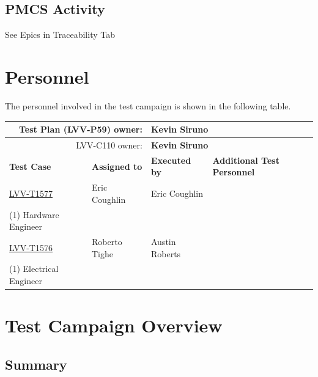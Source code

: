 \documentclass[SE,lsstdraft,STR,toc]{lsstdoc}
\begin{document}
  \subsection{PMCS Activity}
  See Epics in Traceability Tab


\newpage
\section{Personnel}
\label{sect:personnel}

The personnel involved in the test campaign is shown in the following table.

\begin{longtable}{p{3cm}p{3cm}p{3cm}p{6cm}}
\hline
\multicolumn{2}{r}{Test Plan (LVV-P59) owner:} &
\multicolumn{2}{l}{\textbf{ Kevin Siruno } }\\\hline
\multicolumn{2}{r}{ LVV-C110 owner:} &
\multicolumn{2}{l}{\textbf{
    Kevin Siruno
}
} \\\hline
\textbf{Test Case} & \textbf{Assigned to} & \textbf{Executed by} & \textbf{Additional Test Personnel} \\ \hline
\href{https://jira.lsstcorp.org/secure/Tests.jspa#/testCase/LVV-T1577}{LVV-T1577}
& {\small Eric Coughlin } & {\small Eric Coughlin } &
\begin{minipage}[]{6cm}
\smallskip
{\small (1) Software Engineer\\
(1) Hardware Engineer
 }
\medskip
\end{minipage}
\\ \hline
\href{https://jira.lsstcorp.org/secure/Tests.jspa#/testCase/LVV-T1576}{LVV-T1576}
& {\small Roberto Tighe } & {\small Austin Roberts } &
\begin{minipage}[]{6cm}
\smallskip
{\small (1) Mechanical Engineer/Optical Engineer\\
(1) Electrical Engineer
 }
\medskip
\end{minipage}
\\ \hline
\end{longtable}

\newpage

\section{Test Campaign Overview}
\label{sect:overview}

\subsection{Summary}
\label{sect:summarytable}
\end{document}
